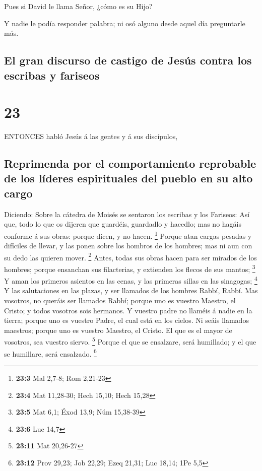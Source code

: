  Pues si David le llama Señor, ¿cómo es su Hijo?

 Y nadie le podía responder palabra; ni osó alguno desde
aquel día preguntarle más.

\hypertarget{el-gran-discurso-de-castigo-de-jesuxfas-contra-los-escribas-y-fariseos}{%
\subsection{El gran discurso de castigo de Jesús contra los escribas y
fariseos}\label{el-gran-discurso-de-castigo-de-jesuxfas-contra-los-escribas-y-fariseos}}

\hypertarget{section-22}{%
\section{23}\label{section-22}}

 ENTONCES habló Jesús á las gentes y á sus discípulos,

\hypertarget{reprimenda-por-el-comportamiento-reprobable-de-los-luxedderes-espirituales-del-pueblo-en-su-alto-cargo}{%
\subsection{Reprimenda por el comportamiento reprobable de los líderes
espirituales del pueblo en su alto
cargo}\label{reprimenda-por-el-comportamiento-reprobable-de-los-luxedderes-espirituales-del-pueblo-en-su-alto-cargo}}

 Diciendo: Sobre la cátedra de Moisés se sentaron los
escribas y los Fariseos:  Así que, todo lo que os dijeren
que guardéis, guardadlo y hacedlo; mas no hagáis conforme á sus obras:
porque dicen, y no hacen. \footnote{\textbf{23:3} Mal 2,7-8; Rom 2,21-23}
 Porque atan cargas pesadas y difíciles de llevar, y las
ponen sobre los hombros de los hombres; mas ni aun con su dedo las
quieren mover. \footnote{\textbf{23:4} Mat 11,28-30; Hech 15,10; Hech
  15,28}  Antes, todas sus obras hacen para ser mirados de
los hombres; porque ensanchan sus filacterias, y extienden los flecos de
sus mantos; \footnote{\textbf{23:5} Mat 6,1; Éxod 13,9; Núm 15,38-39}
 Y aman los primeros asientos en las cenas, y las primeras
sillas en las sinagogas; \footnote{\textbf{23:6} Luc 14,7} 
Y las salutaciones en las plazas, y ser llamados de los hombres Rabbí,
Rabbí.  Mas vosotros, no queráis ser llamados Rabbí; porque
uno es vuestro Maestro, el Cristo; y todos vosotros sois hermanos.
 Y vuestro padre no llaméis á nadie en la tierra; porque uno
es vuestro Padre, el cual está en los cielos.  Ni seáis
llamados maestros; porque uno es vuestro Maestro, el Cristo.
 El que es el mayor de vosotros, sea vuestro siervo.
\footnote{\textbf{23:11} Mat 20,26-27}  Porque el que se
ensalzare, será humillado; y el que se humillare, será ensalzado.
\footnote{\textbf{23:12} Prov 29,23; Job 22,29; Ezeq 21,31; Luc 18,14;
  1Pe 5,5}

